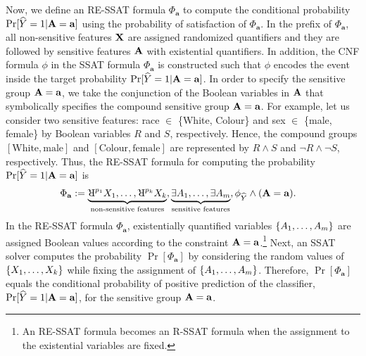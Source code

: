 Now, we define an RE-SSAT formula $\Phi_{\mathbf{a}}$ to compute the conditional probability $\Pr[\widehat{Y} = 1 | \mathbf{A} = \mathbf{a}]$ using the probability of satisfaction of $\Phi_{\mathbf{a}}$. In the prefix of $ \Phi_{\mathbf{a}} $,  all non-sensitive features $ \mathbf{X} $ are assigned randomized quantifiers and they are followed by sensitive features $ \mathbf{A} $ with existential quantifiers.  In addition, the CNF formula $ \phi $ in the SSAT formula $ \Phi_{\mathbf{a}} $ is constructed such that $ \phi $ encodes the event inside the target probability $ \Pr[\widehat{Y} = 1 | \mathbf{A} = \mathbf{a}] $. In order to specify the sensitive group $ \mathbf{A} = \mathbf{a} $, we take the conjunction of the Boolean variables in $ \mathbf{A} $ that symbolically specifies the compound sensitive group $ \mathbf{A} = \mathbf{a} $. For example, let us consider two sensitive features: race $ \in $ \{White, Colour\} and sex $ \in $ \{male, female\} by Boolean variables $ R $ and $ S $,  respectively. Hence, the compound groups $ [\textrm{White}, \textrm{male}] $ and $[\textrm{Colour}, \textrm{female}]$ are represented by $ R \wedge S $ and $ \neg R \wedge \neg S $, respectively. Thus, the RE-SSAT formula for computing the probability  $ \Pr[\widehat{Y} = 1 | \mathbf{A} = \mathbf{a}] $ is
\begin{equation}	\label{fairness_justicia_eq:re}
\begin{split}
	\Phi_{\mathbf{a}} := \underbrace{\R^{p_{1}}X_1, \dots, \R^{p_{\numnonsensitive}}X_{\numnonsensitive}}_{\text{non-sensitive features}},  &\underbrace{\exists A_1,\dots, \exists A_{\numsensitive}}_{\text{sensitive features}},
\phi_{\widehat{Y}} \wedge (\sensitive =\mathbf{a}).\notag
\end{split}
\end{equation}
In the RE-SSAT formula $ \Phi_{\mathbf{a}} $, existentially quantified variables  $ \{A_1, \dots, A_{m}\} $ are assigned Boolean values  according  to the constraint $ \mathbf{A} =\mathbf{a} $.\footnote{An RE-SSAT formula becomes an R-SSAT formula when the assignment to the existential variables are fixed.} Next,  an SSAT solver computes the probability $ \Pr[\Phi_{\mathbf{a}}] $ by considering the random values of $ \{X_1, \dots, X_{k}\} $ while fixing the assignment of $ \{A_1, \dots, A_{m}\} $. Therefore, $ \Pr[\Phi_{\mathbf{a}}] $ equals the conditional probability of positive prediction of the classifier, $ \Pr[\widehat{Y} = 1 | \mathbf{A} = \mathbf{a}] $, for the sensitive group $ \mathbf{A} = \mathbf{a} $. 

